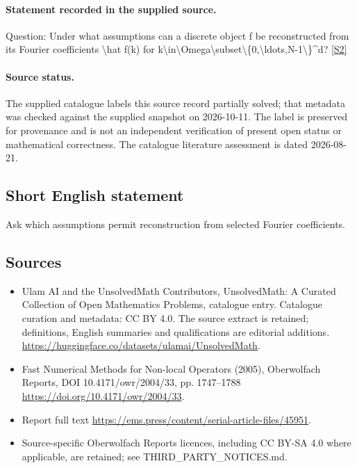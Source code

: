 \documentclass[11pt]{article}
\newcommand{\sref}[2]{\hyperlink{source:#1:#2}{[S#2]}}
\begin{document}
\paragraph{Statement recorded in the supplied source.}
Question: Under what assumptions can a discrete object f be reconstructed from its Fourier coefficients \textbackslash{}hat f(k) for k\textbackslash{}in\textbackslash{}Omega\textbackslash{}subset\textbackslash{}\{0,\textbackslash{}ldots,N-1\textbackslash{}\}\textasciicircum{}d? \sref{statement}{2}
\paragraph{Source status.}
The supplied catalogue labels this source record partially solved; that metadata was checked against the supplied snapshot on 2026-10-11. The label is preserved for provenance and is not an independent verification of present open status or mathematical correctness. The catalogue literature assessment is dated 2026-08-21.
\subsection{Short English statement}
Ask which assumptions permit reconstruction from selected Fourier coefficients.
\subsection{Sources}
\begin{itemize}
\item[\hypertarget{source:statement:1}{S1}] Ulam AI and the UnsolvedMath Contributors, UnsolvedMath: A Curated Collection of Open Mathematics Problems, catalogue entry. Catalogue curation and metadata: CC BY 4.0. The source extract is retained; definitions, English summaries and qualifications are editorial additions.
\url{https://huggingface.co/datasets/ulamai/UnsolvedMath}.
\item[\hypertarget{source:statement:2}{S2}] Fast Numerical Methods for Non-local Operators (2005), Oberwolfach Reports, DOI 10.4171/owr/2004/33, pp. 1747--1788
\url{https://doi.org/10.4171/owr/2004/33}.
\item[\hypertarget{source:statement:3}{S3}] Report full text
\url{https://ems.press/content/serial-article-files/45951}.
\item Source-specific Oberwolfach Reports licences, including CC BY-SA 4.0 where applicable, are retained; see THIRD\_PARTY\_NOTICES.md.
\end{itemize}
\end{document}
